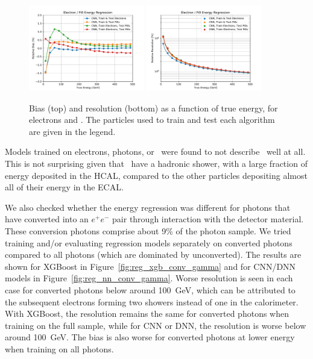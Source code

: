 \begin{figure}[htbp]
\centering
\includegraphics[width=0.45\textwidth]{Images/Calo/bias_vs_E_ElePi0Fixed_nn_cross_zoom.pdf}
\includegraphics[width=0.45\textwidth]{Images/Calo/res_vs_E_ElePi0Fixed_nn_cross_fits.pdf}
\caption{Bias (top) and resolution (bottom) as a function of true energy, for electrons and \pizero.  The particles used to train and test each algorithm are given in the legend.
}
\label{fig:reg_nn_cross_pi0}
\end{figure}

Models trained on electrons, photons, or \pizero\ were found to not describe \chpi\ well at all.  This is not surprising given that \chpi\ have a hadronic shower, with a large fraction of energy deposited in the HCAL, compared to the other particles depositing almost all of their energy in the ECAL.

We also checked whether the energy regression was different for photons that have converted into an $e^{+}e^{-}$ pair through interaction with the detector material.  These conversion photons comprise about 9\% of the photon sample.  We tried training and/or evaluating regression models separately on converted photons compared to all photons (which are dominated by unconverted).  The results are shown for XGBoost in Figure~\ref{fig:reg_xgb_conv_gamma} and for CNN/DNN models in Figure~\ref{fig:reg_nn_conv_gamma}.  Worse resolution is seen in each case for converted photons below around 100~GeV, which can be attributed to the subsequent electrons forming two showers instead of one in the calorimeter.  With XGBoost, the resolution remains the same for converted photons when training on the full sample, while for CNN or DNN, the resolution is worse below around 100~GeV.  The bias is also worse for converted photons at lower energy when training on all photons.

